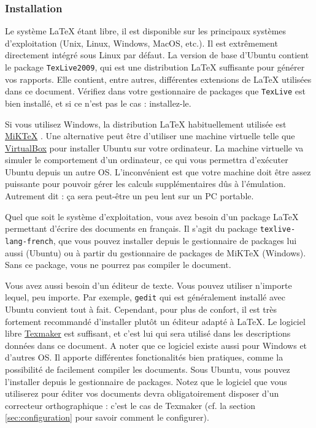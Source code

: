 \documentclass{ASD}
\begin{document}
\subsubsection{Installation}
\label{sec:installation}
Le système \LaTeX{} étant libre, il est disponible sur les principaux systèmes d'exploitation (Unix, Linux, Windows, MacOS, etc\@.). Il est extrêmement directement intégré sous Linux par défaut.
La version de base d'Ubuntu contient le package \texttt{TexLive2009}, qui est une distribution \LaTeX{} suffisante pour générer vos rapports. Elle contient, entre autres, différentes extensions de \LaTeX{} utilisées dans ce document. Vérifiez dans votre gestionnaire de packages que \texttt{TexLive} est bien installé, et si ce n'est pas le cas : installez-le.

Si vous utilisez Windows, la distribution \LaTeX{} habituellement utilisée est \href{http://miktex.org/}{MiKTeX} \cite{MiKTeX2015}. Une alternative peut être d'utiliser une machine virtuelle telle que \href{http://www.virtualbox.org/}{VirtualBox} \cite{Oracle2011} pour installer Ubuntu sur votre ordinateur. La machine virtuelle va simuler le comportement d'un ordinateur, ce qui vous permettra d'exécuter Ubuntu depuis un autre OS. L'inconvénient est que votre machine doit \^etre assez puissante pour pouvoir gérer les calculs supplémentaires d\^us à l'émulation. Autrement dit : ça sera peut-être un peu lent sur un PC portable. 

Quel que soit le système d'exploitation, vous avez besoin d'un package \LaTeX{} permettant d'écrire des documents en français. Il s'agit du package \texttt{texlive-lang-french}, que vous pouvez installer depuis le gestionnaire de packages lui aussi (Ubuntu) ou à partir du gestionnaire de packages de MiKTeX (Windows). Sans ce package, vous ne pourrez pas compiler le document.

Vous avez aussi besoin d'un éditeur de texte. Vous pouvez utiliser n'importe lequel, peu importe. Par exemple, \texttt{gedit} qui est généralement installé avec Ubuntu convient tout à fait. Cependant, pour plus de confort, il est très fortement recommandé d'installer plutôt un éditeur adapté à \LaTeX{}. Le logiciel libre \href{http://www.xm1math.net/texmaker/}{Texmaker} \cite{Texmaker2011} est suffisant, et c'est lui qui sera utilisé dans les descriptions données dans ce document. A noter que ce logiciel existe aussi pour Windows et d'autres OS. Il apporte différentes fonctionalités bien pratiques, comme la possibilité de facilement compiler les documents. Sous Ubuntu, vous pouvez l'installer depuis le gestionnaire de packages. Notez que le logiciel que vous utiliserez pour éditer vos documents devra obligatoirement disposer d'un correcteur orthographique : c'est le cas de Texmaker (cf\@. la section \ref{sec:configuration} pour savoir comment le configurer).
\end{document}
